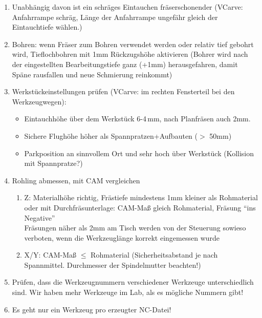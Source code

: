 \documentclass{\basedir/fablab-document}
\renewcommand{\todo}[1]{\colorbox{yellow}{{#1}}}
\begin{document}
\begin{enumerate}
Den erzeugten Werkzeugweg kritisch anschauen, ob er wirklich immer schräg verfährt.
	\item Unabhängig davon ist ein schräges Eintauchen fräserschonender (VCarve: Anfahrrampe schräg, Länge der Anfahrrampe ungefähr gleich der Eintauchtiefe wählen.)
	\item Bohren: wenn Fräser zum Bohren verwendet werden oder relativ tief gebohrt wird, Tieflochbohren mit 1mm Rückzugshöhe aktivieren (Bohrer wird nach der eingestellten Bearbeitungstiefe ganz (+1mm) herausgefahren, damit Späne rausfallen und neue Schmierung reinkommt)
	\item Werkstückeinstellungen prüfen (VCarve: im rechten Fensterteil bei den Werkzeugwegen):
\begin{itemize}
	\item Eintauchhöhe über dem Werkstück 6-4\,mm, nach Planfräsen auch 2mm.
	\item Sichere Flughöhe höher als Spannpratzen+Aufbauten ($>$ 50mm)
	\item Parkposition an sinnvollem Ort und sehr hoch über Werkstück (Kollision mit Spannpratze?)
\end{itemize}
	\item Rohling abmessen, mit CAM vergleichen
 \begin{enumerate}
	\item Z: Materialhöhe richtig, Frästiefe mindestens 1mm kleiner als Rohmaterial \\
        oder mit Durchfräsunterlage: CAM-Maß gleich Rohmaterial, Fräsung \enquote{ins Negative}\\
        Fräsungen näher als 2mm am Tisch werden von der Steuerung sowieso verboten, wenn die Werkzeuglänge korrekt eingemessen wurde
	\item X/Y: CAM-Maß $\leq$ Rohmaterial (Sicherheitsabstand je nach Spannmittel. Durchmesser der Spindelmutter beachten!)
 \end{enumerate}
	\item Prüfen, dass die Werkzeugnummern verschiedener Werkzeuge unterschiedlich sind. Wir haben mehr Werkzeuge im Lab, als es mögliche Nummern gibt!
	\item Es geht nur ein Werkzeug pro erzeugter NC-Datei!%
\end{enumerate}
\end{document}
